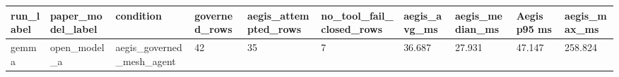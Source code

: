 \begin{tabular}{llllllllll}
 \hline
run\_label & paper\_model\_label & condition & governed\_rows & aegis\_attempted\_rows & no\_tool\_fail\_closed\_rows & aegis\_avg\_ms & aegis\_median\_ms & Aegis p95 ms & aegis\_max\_ms \\
 \hline
gemma & open\_model\_a & aegis\_governed\_mesh\_agent & 42 & 35 & 7 & 36.687 & 27.931 & 47.147 & 258.824 \\
 \hline
\end{tabular}
